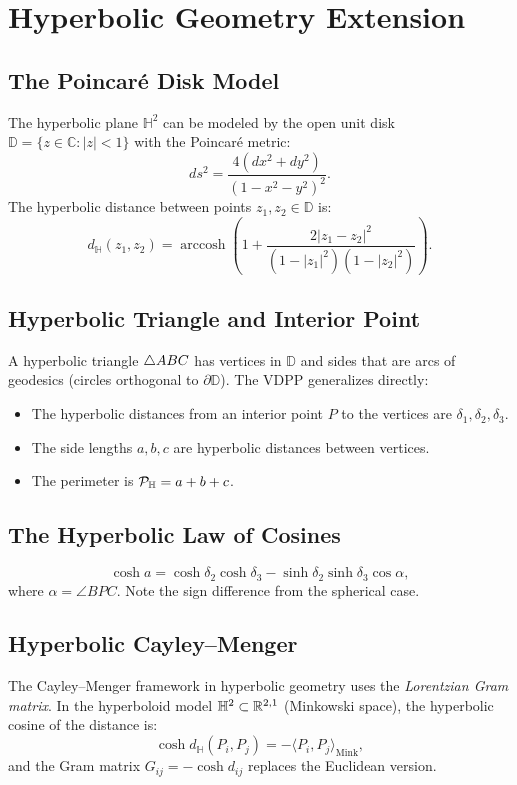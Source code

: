 \chapter{Hyperbolic Geometry Extension}
\label{ch:hyperbolic}

\section{The Poincar\'e Disk Model}
The hyperbolic plane $\mathbb{H}^2$ can be modeled by the open unit disk $\mathbb{D} = \{z \in \mathbb{C} : |z| < 1\}$ with the Poincar\'e metric:
\begin{equation}
ds^2 = \frac{4(dx^2 + dy^2)}{(1 - x^2 - y^2)^2}.
\end{equation}
The hyperbolic distance between points $z_1, z_2 \in \mathbb{D}$ is:
\begin{equation}
d_{\mathbb{H}}(z_1, z_2) = \operatorname{arccosh}\left(1 + \frac{2|z_1 - z_2|^2}{(1-|z_1|^2)(1-|z_2|^2)}\right).
\end{equation}

\section{Hyperbolic Triangle and Interior Point}
A hyperbolic triangle $\triangle ABC$ has vertices in $\mathbb{D}$ and sides that are arcs of geodesics (circles orthogonal to $\partial\mathbb{D}$). The VDPP generalizes directly:
\begin{itemize}
    \item The hyperbolic distances from an interior point $P$ to the vertices are $\delta_1, \delta_2, \delta_3$.
    \item The side lengths $a, b, c$ are hyperbolic distances between vertices.
    \item The perimeter is $\mathcal{P}_{\mathbb{H}} = a + b + c$.
\end{itemize}

\section{The Hyperbolic Law of Cosines}
\begin{equation}
\cosh a = \cosh\delta_2\cosh\delta_3 - \sinh\delta_2\sinh\delta_3\cos\alpha,
\end{equation}
where $\alpha = \angle BPC$. Note the sign difference from the spherical case.

\section{Hyperbolic Cayley--Menger}
The Cayley--Menger framework in hyperbolic geometry uses the \emph{Lorentzian Gram matrix}. In the hyperboloid model $\mathbb{H}^2 \subset \mathbb{R}^{2,1}$ (Minkowski space), the hyperbolic cosine of the distance is:
\begin{equation}
\cosh d_{\mathbb{H}}(P_i, P_j) = -\langle P_i, P_j \rangle_{\text{Mink}},
\end{equation}
and the Gram matrix $G_{ij} = -\cosh d_{ij}$ replaces the Euclidean version.

